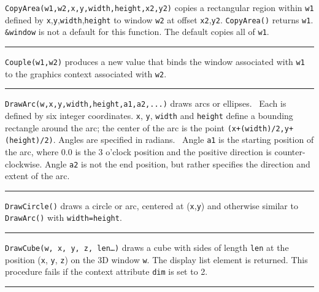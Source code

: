 \noindent
\texttt{CopyArea(w1,w2,x,y,width,height,x2,y2)} copies a rectangular
region within \texttt{w1} defined by
\texttt{x},\texttt{y},\texttt{width},\texttt{height} to window
\texttt{w2} at offset \texttt{x2},\texttt{y2}. \texttt{CopyArea()}
returns \texttt{w1}. \texttt{\&window} is not a default for this
function. The default copies all of \texttt{w1}.

\bigskip\hrule\vspace{0.1cm}

\noindent
\texttt{Couple(w1,w2)} produces a new value that binds the window
associated with \texttt{w1} to the graphics context associated with
\texttt{w2}.

\bigskip\hrule\vspace{0.1cm}

\noindent
\texttt{DrawArc(w,x,y,width,height,a1,a2,...)} draws arcs or ellipses.
\ Each is defined by six integer coordinates. \texttt{x}, \texttt{y},
\texttt{width} and \texttt{height} define a bounding rectangle around
the arc; the center of the arc is the point
\texttt{(x+(width)/2,y+(height)/2)}. Angles are specified in radians.
\ Angle \texttt{a1} is the starting position of the arc, where 0.0 is
the 3 o'clock position and the positive direction is
counter-clockwise. Angle \texttt{a2} is not the end position, but
rather specifies the direction and extent of the arc.

\bigskip\hrule\vspace{0.1cm}

\noindent
\texttt{DrawCircle()} draws a circle or arc, centered at
(\texttt{x},\texttt{y}) and otherwise similar to \texttt{DrawArc()}
with \texttt{width=height}.

\bigskip\hrule\vspace{0.1cm}

\noindent
\texttt{DrawCube(w, x, y, z, len{\dots})} draws a cube with sides of
length \texttt{len} at the position (\texttt{x}, \texttt{y},
\texttt{z}) on the 3D window \texttt{w}. The display list element is
returned. This procedure fails if the context attribute \texttt{dim} is
set to 2. 

\bigskip\hrule\vspace{0.1cm}

